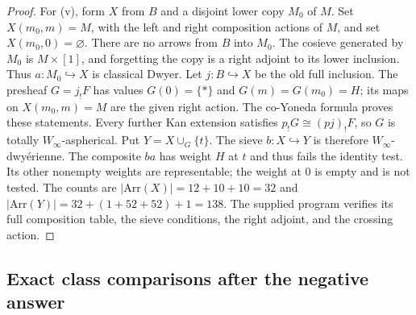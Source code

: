 \documentclass[11pt,a4paper]{article}
\theoremstyle{definition}
\theoremstyle{remark}
\newcommand{\Winfty}{W_\infty}
\begin{document}
\begin{proof}
For (v), form $X$ from $B$ and a disjoint lower copy $M_0$ of $M$. Set $X(m_0,m)=M$, with the left and right composition actions of $M$, and set $X(m_0,0)=\varnothing$. There are no arrows from $B$ into $M_0$. The cosieve generated by $M_0$ is $M\times[1]$, and forgetting the copy is a right adjoint to its lower inclusion. Thus $a:M_0\hookrightarrow X$ is classical Dwyer. Let $j:B\hookrightarrow X$ be the old full inclusion. The presheaf $G=j_!F$ has values $G(0)=\{*\}$ and $G(m)=G(m_0)=H$; its maps on $X(m_0,m)=M$ are the given right action. The co-Yoneda formula proves these statements. Every further Kan extension satisfies $p_!G\cong(pj)_!F$, so $G$ is totally $\Winfty$-aspherical. Put $Y=X\cup_G\{t\}$. The sieve $b:X\hookrightarrow Y$ is therefore $\Winfty$-dwy\'erienne. The composite $ba$ has weight $H$ at $t$ and thus fails the identity test. Its other nonempty weights are representable; the weight at $0$ is empty and is not tested. The counts are $|\mathrm{Arr}(X)|=12+10+10=32$ and $|\mathrm{Arr}(Y)|=32+(1+52+52)+1=138$. The supplied program verifies its full composition table, the sieve conditions, the right adjoint, and the crossing action.
\end{proof}

\subsection{Exact class comparisons after the negative answer}
\end{document}
